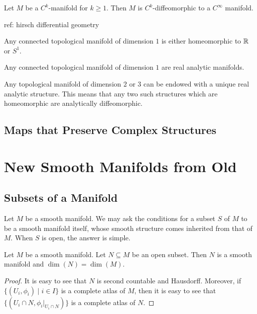 \documentclass[a4paper]{article}
\begin{document}
\begin{thm}{}{} Let $M$ be a $C^k$-manifold for $k\geq 1$. Then $M$ is $C^k$-diffeomorphic to a $C^\infty$ manifold. 
\end{thm}

ref: hirsch differential geometry

\begin{thm}{}{} Any connected topological manifold of dimension $1$ is either homeomorphic to $\mathbb{R}$ or $S^1$. 
\end{thm}

\begin{thm}{}{} Any connected topological manifold of dimension $1$ are real analytic manifolds. 
\end{thm}

\begin{thm}{}{} Any topological manifold of dimension $2$ or $3$ can be endowed with a unique real analytic structure. This means that any two such structures which are homeomorphic are analytically diffeomorphic. 
\end{thm}

\subsection{Maps that Preserve Complex Structures}

\pagebreak
\section{New Smooth Manifolds from Old}
\subsection{Subsets of a Manifold}
Let $M$ be a smooth manifold. We may ask the conditions for a subset $S$ of $M$ to be a smooth manifold itself, whose smooth structure comes inherited from that of $M$. When $S$ is open, the answer is simple. 

\begin{prp}{}{} Let $M$ be a smooth manifold. Let $N\subseteq M$ be an open subset. Then $N$ is a smooth manifold and $\dim(N)=\dim(M)$. \tcbline
\begin{proof}
It is easy to see that $N$ is second countable and Hausdorff. Moreover, if $\{(U_i,\phi_i)\;|\;i\in I\}$ is a complete atlas of $M$, then it is easy to see that $\{(U_i\cap N,\phi_i|_{U_i\cap N})\}$ is a complete atlas of $N$. 
\end{proof}
\end{prp}
\end{document}
